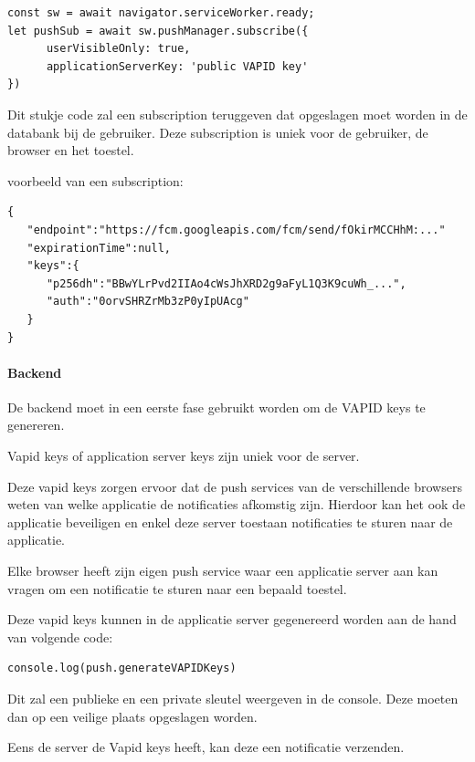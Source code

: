 \begin{lstlisting}
const sw = await navigator.serviceWorker.ready;
let pushSub = await sw.pushManager.subscribe({
      userVisibleOnly: true,
      applicationServerKey: 'public VAPID key'
})
\end{lstlisting}

			Dit stukje code zal een subscription teruggeven dat opgeslagen moet worden in de databank bij de gebruiker. Deze subscription is uniek voor de gebruiker, de browser en het toestel.
			\autocite{Gaunt2019a}
			
			voorbeeld van een subscription:
	
\begin{lstlisting}
{
   "endpoint":"https://fcm.googleapis.com/fcm/send/fOkirMCCHhM:..."
   "expirationTime":null,
   "keys":{
      "p256dh":"BBwYLrPvd2IIAo4cWsJhXRD2g9aFyL1Q3K9cuWh_...",
      "auth":"0orvSHRZrMb3zP0yIpUAcg"
   }
}
\end{lstlisting}


		\paragraph{Backend}
			De backend moet in een eerste fase gebruikt worden om de VAPID keys te genereren.
			
			Vapid keys of application server keys zijn uniek voor de server.
			
			Deze vapid keys zorgen ervoor dat de push services van de verschillende browsers weten van welke applicatie de notificaties afkomstig zijn. Hierdoor kan het ook de applicatie beveiligen en enkel deze server toestaan notificaties te sturen naar de applicatie.
			
			Elke browser heeft zijn eigen push service waar een applicatie server aan kan vragen om een notificatie te sturen naar een bepaald toestel.
			\autocite{Gaunt2020}
			
			Deze vapid keys kunnen in de applicatie server gegenereerd worden aan de hand van volgende code:
			
\begin{lstlisting}
console.log(push.generateVAPIDKeys)
\end{lstlisting}

			Dit zal een publieke en een private sleutel weergeven in de console. Deze moeten dan op een veilige plaats opgeslagen worden.
			
			Eens de server de Vapid keys heeft, kan deze een notificatie verzenden.
			
